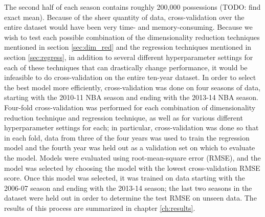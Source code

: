 The second half of each season contains roughly 200,000 possessions (TODO: find
exact mean). Because of the sheer quantity of data, cross-validation over the entire
dataset would have been very time- and memory-consuming. Because we wish to test
each possible combination of the dimensionality reduction techniques mentioned in
section \ref{sec:dim_red} and the regression techniques mentioned in section
\ref{sec:regress}, in addition to several different hyperparameter settings for each
of these techniques that can drastically change performance, it would be infeasible
to do cross-validation on the entire ten-year dataset. In order to select the best
model more efficiently, cross-validation was done on four seasons of data, starting
with the 2010-11 NBA season and ending with the 2013-14 NBA season.  Four-fold
cross-validation was performed for each combination of dimensionality reduction
technique and regression technique, as well as for various different hyperparameter
settings for each; in particular, cross-validation was done so that in each fold,
data from three of the four years was used to train the regression model and the
fourth year was held out as a validation set on which to evaluate the model. Models
were evaluated using root-mean-square error (RMSE), and the model was selected by
choosing the model with the lowest cross-validation RMSE score. Once this model was
selected, it was trained on data starting with the 2006-07 season and ending with
the 2013-14 season; the last two seasons in the dataset were held out in order to
determine the test RMSE on unseen data. The results of this process are summarized
in chapter \ref{ch:results}.
